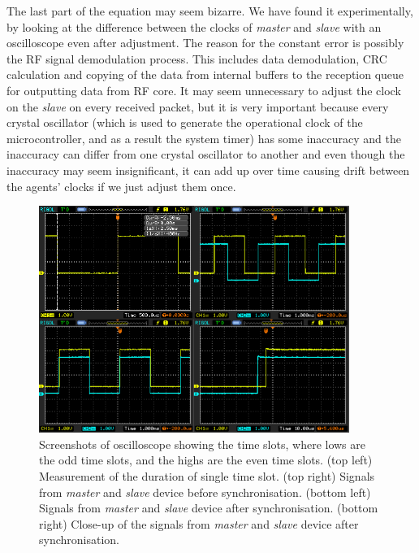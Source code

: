 The last part of the equation may seem bizarre. We have found it experimentally, by looking at the difference between the clocks of \emph{master} and \emph{slave} with an oscilloscope even after adjustment. The reason for the constant error is possibly the RF signal demodulation process. This includes data demodulation, CRC calculation and copying of the data from internal buffers to the reception queue for outputting data from RF core.
It may seem unnecessary to adjust the clock on the \emph{slave} on every received packet, but it is very important because every crystal oscillator (which is used to generate the operational clock of the microcontroller, and as a result the system timer) has some inaccuracy and the inaccuracy can differ from one crystal oscillator to another and even though the inaccuracy may seem insignificant, it can add up over time causing drift between the agents' clocks if we just adjust them once.

\begin{figure}[H]
\begin{center}
\includegraphics[width=0.90\textwidth]{time-slots.png}
\end{center}
\caption{Screenshots of oscilloscope showing the time slots, where lows are the odd time slots, and the highs are the even time slots. (top left) Measurement of the duration of single time slot. (top right) Signals from \emph{master} and \emph{slave} device before synchronisation. (bottom left) Signals from \emph{master} and \emph{slave} device after synchronisation. (bottom right) Close-up of the signals from \emph{master} and \emph{slave} device after synchronisation. }
\label{fig-oscilloscope}
\end{figure}


